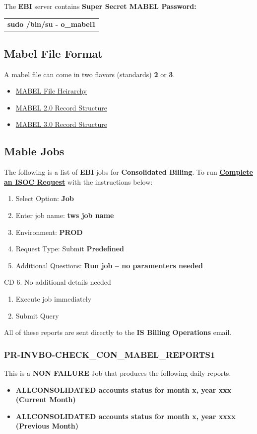 \documentclass[12pt,twoside]{article}
\begin{document}
The \textbf{EBI} server contains \textbf{Super Secret MABEL Password:} 
\begin{center}
\begin{tabular}{l}
\textbf{sudo /bin/su - o\_mabel1}\\
\end{tabular}
\end{center}

\subsection{Mabel File Format}
\label{sec:orgheadline46}
A mabel file can  come in two flavors (standards) \textbf{2} or \textbf{3}. 
\begin{itemize}
\item \href{docs/MABEL\%20Hierarchy.pdf}{MABEL File Heirarchy}
\item \href{docs/Mable2_record_structure_C07.pdf}{MABEL 2.0 Record Structure}
\item \href{docs/Mabel3_record_structure_CH07.pdf}{MABEL 3.0 Record Structure}
\end{itemize}

\subsection{Mable Jobs}
\label{sec:orgheadline55}
The following is a list of \textbf{EBI} jobs for \textbf{Consolidated Billing}. To run \textbf{\href{http://isoc.uscc.com/supportrequestform.php}{Complete an ISOC Request}} with the instructions below:
\begin{enumerate}
\item Select Option: \textbf{Job}
\item Enter job name: \textbf{tws job name}
\item Environment: \textbf{PROD}
\item Request Type: Submit \textbf{Predefined}
\item Additional Questions: \textbf{Run job – no paramenters needed}
\end{enumerate}
CD    6. No additional details needed
\begin{enumerate}
\item Execute job immediately
\item Submit Query
\end{enumerate}
All of these reports are sent directly to the \textbf{IS Billing Operations} email.   
\small
\subsubsection{PR-INVBO-CHECK\_CON\_MABEL\_REPORTS1}
\label{sec:orgheadline47}
This is a \textbf{NON FAILURE} Job that produces the following daily reports.
\begin{itemize}
\item \textbf{ALLCONSOLIDATED accounts status for month x, year xxx (Current Month)}
\item \textbf{ALLCONSOLIDATED accounts status for month x, year xxxx (Previous Month)}
\end{itemize}
\end{document}
